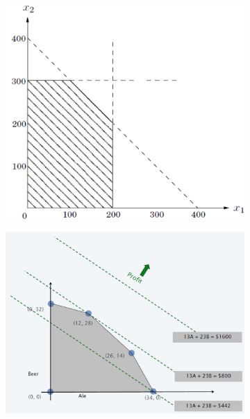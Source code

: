 \begin{example}
\begin{figure}[ht!]
        \begin{subfigure}{0.45\linewidth}
            \centering
            \includegraphics[width=\linewidth]{figures/feasible-region.png}
        \end{subfigure}
        \hfil%
        \begin{subfigure}{0.45\linewidth}
            \centering
            \includegraphics[width=\linewidth]{figures/opt-sol-at-a-vertex.png}
        \end{subfigure}
    \end{figure}
\end{example}

